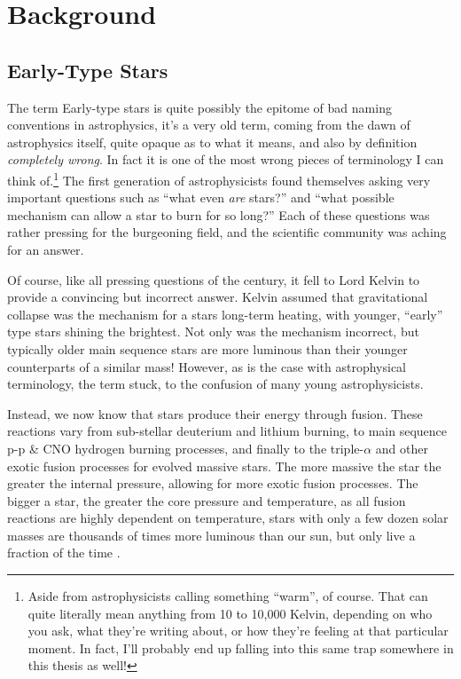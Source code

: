 \chapter{Background}

\section{Early-Type Stars}
\label{sec:earlytype}

The term Early-type stars is quite possibly the epitome of bad naming conventions in astrophysics, it's a very old term, coming from the dawn of astrophysics itself, quite opaque as to what it means, and also by definition \textit{completely wrong}. In fact it is one of the most wrong pieces of terminology I can think of.\footnote{Aside from astrophysicists calling something ``warm'', of course. That can quite literally mean anything from 10 to 10,000 Kelvin, depending on who you ask, what they're writing about, or how they're feeling at that particular moment. In fact, I'll probably end up falling into this same trap somewhere in this thesis as well!}
The first generation of astrophysicists found themselves asking very important questions such as ``what even \textit{are} stars?'' and ``what possible mechanism can allow a star to burn for so long?'' Each of these questions was rather pressing for the burgeoning field, and the scientific community was aching for an answer.

Of course, like all pressing questions of the  century, it fell to Lord Kelvin to provide a convincing but incorrect answer. Kelvin assumed that gravitational collapse was the mechanism for a stars long-term heating, with younger, ``early'' type stars shining the brightest. Not only was the mechanism incorrect, but typically older main sequence stars are more luminous than their younger counterparts of a similar mass! However, as is the case with astrophysical terminology, the term stuck, to the confusion of many young astrophysicists.


Instead, we now know that stars produce their energy through fusion. These reactions vary from sub-stellar deuterium and lithium burning, to main sequence p-p \& CNO hydrogen burning processes, and finally to the triple-$\alpha$ and other exotic fusion processes for evolved massive stars. The more massive the star the greater the internal pressure, allowing for more exotic fusion processes.
The bigger a star, the greater the core pressure and temperature, as all fusion reactions are highly dependent on temperature, stars with only a few dozen solar masses are thousands of times more luminous than our sun, but only live a fraction of the time \parencite{carrollIntroductionModernAstrophysics2014}.

